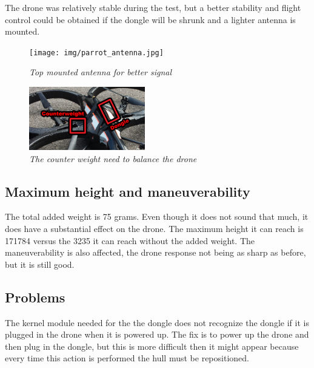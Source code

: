 The drone was relatively stable during the test, but a better stability and flight control could be obtained if the dongle will be shrunk and a lighter antenna is mounted.


\begin{figure}[ht]
\begin{center}
\texttt{[image: img/parrot\_antenna.jpg]}
\end{center}
\caption{\small \itshape{Top mounted antenna for better signal}}
\end{figure}

\begin{figure}[ht]
\begin{center}
\includegraphics[width=0.45\textwidth]{img/counterweight.png}
\end{center}
\caption{\small \itshape{The counter weight need to balance the drone}}
\end{figure}

\subsection{Maximum height and maneuverability}

The total added weight is 75 grams. Even though it does not sound that much, it does have a substantial effect on the drone. The maximum height it can reach is 171784 versus the 3235 it can reach without the added weight. The maneuverability is also affected, the drone response not being as sharp as before, but it is still good.

\subsection{Problems}

The kernel module needed for the the dongle does not recognize the dongle if it is plugged in the drone when it is powered up. The fix is to power up the drone and then plug in the dongle, but this is more difficult then it might appear because every time this action is performed the hull must be repositioned.






\clearpage
 

